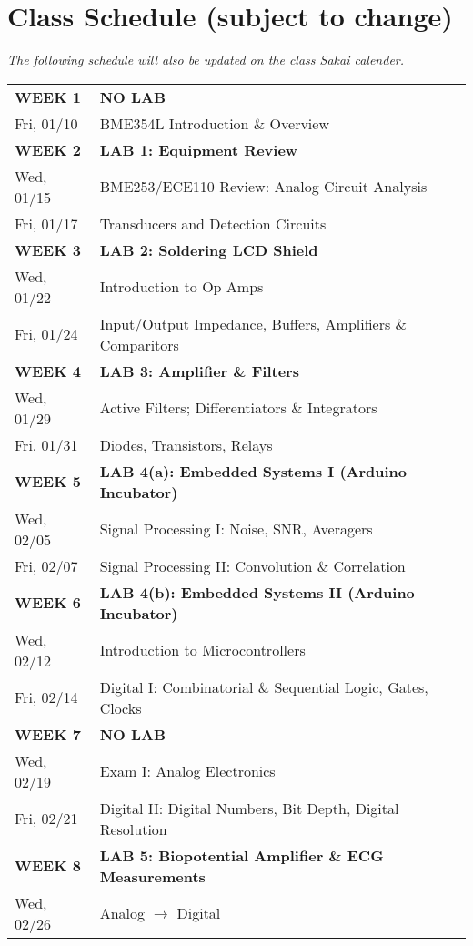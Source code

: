 \section{Class Schedule (subject to change)}
\emph{The following schedule will also be updated on the class Sakai calender.}\\
\begin{tabular}{|l|l|} \hline
{\bf WEEK 1}      &   {\bf NO LAB} \\
Fri, 01/10  &   BME354L Introduction \& Overview \\ \hline
{\bf WEEK 2}      &   {\bf LAB 1: Equipment Review} \\
Wed, 01/15  &   BME253/ECE110 Review: Analog Circuit Analysis\\
Fri, 01/17  &   Transducers and Detection Circuits \\ \hline
{\bf WEEK 3}      &   {\bf LAB 2: Soldering LCD Shield} \\
Wed, 01/22  &   Introduction to Op Amps \\ 
Fri, 01/24  &   Input/Output Impedance, Buffers, Amplifiers \& Comparitors \\ \hline
{\bf WEEK 4}      &   {\bf LAB 3: Amplifier \& Filters} \\
Wed, 01/29  &   Active Filters; Differentiators \& Integrators \\
Fri, 01/31  &   Diodes, Transistors, Relays \\ \hline
{\bf WEEK 5}      &   {\bf LAB 4(a): Embedded Systems I (Arduino Incubator)} \\
Wed, 02/05  &   Signal Processing I: Noise, SNR, Averagers \\
Fri, 02/07  &   Signal Processing II: Convolution \& Correlation \\ \hline
{\bf WEEK 6}      &   {\bf LAB 4(b): Embedded Systems II (Arduino Incubator)} \\
Wed, 02/12  &   Introduction to Microcontrollers \\
Fri, 02/14  &   Digital I: Combinatorial \& Sequential Logic, Gates, Clocks \\ \hline
{\bf WEEK 7}      &   {\bf NO LAB} \\
Wed, 02/19  &   Exam I: Analog Electronics \\ 
Fri, 02/21  &   Digital II: Digital Numbers, Bit Depth, Digital Resolution \\ \hline
{\bf WEEK 8}      &   {\bf LAB 5: Biopotential Amplifier \& ECG Measurements} \\
Wed, 02/26  &   Analog $\rightarrow$ Digital \\ 

\end{tabular}
